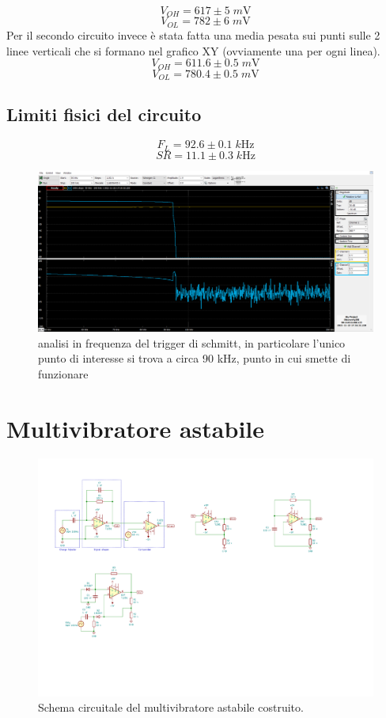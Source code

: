 \documentclass[10pt,a4paper]{article}
\begin{document}
\[
V_{OH} = 617 \pm 5 \; \si{m\V}
\]
\[
V_{OL} = 782 \pm 6 \; \si{m\V}
\]
Per il secondo circuito invece è stata fatta una media pesata sui punti sulle 2 linee verticali che si formano nel grafico XY (ovviamente una per ogni linea).
\[
V_{OH} = 611.6 \pm 0.5 \; \si{m\V}
\]
\[
V_{OL} = 780.4 \pm 0.5 \; \si{m\V}
\]
\subsection{Limiti fisici del circuito}
\[
F_{L} = 92.6 \pm 0.1 \; \si{k\Hz}
\]
\[
SR = 11.1 \pm 0.3 \; \si{k\Hz}
\]
\begin{figure}[htbp]
\centering
\includegraphics[scale=0.4]{schmitt_freq}
\caption{analisi in frequenza del trigger di schmitt, in particolare l'unico punto di interesse si trova a circa 90 kHz, punto in cui smette di funzionare}
\end{figure}
\section{Multivibratore astabile}

\begin{figure}[htbp]
    \centering
	\includegraphics[scale=1.5]{astable}
    \caption{Schema circuitale del multivibratore astabile costruito.
    \label{fig: astableschm}}
\end{figure}
\end{document}
